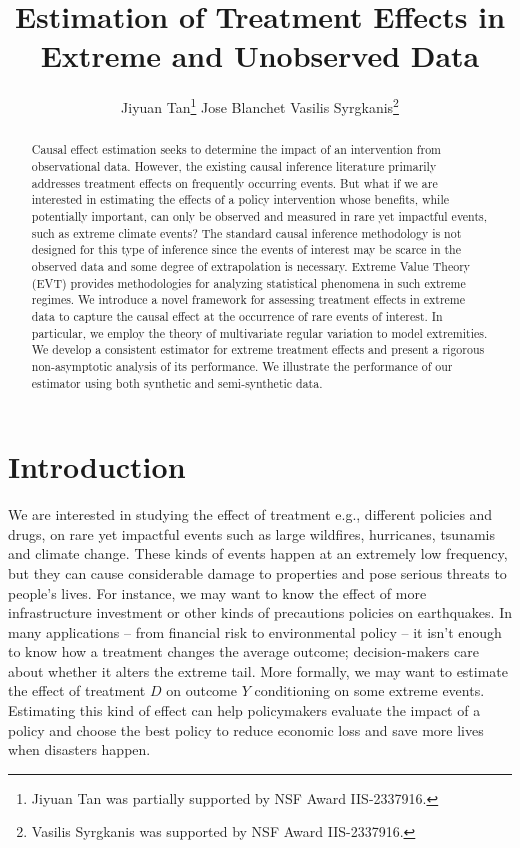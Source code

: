 \documentclass[12pt]{article}
\title{\LARGE Estimation of Treatment Effects in Extreme and Unobserved Data}
\author{Jiyuan Tan\thanks{Jiyuan Tan was partially supported by NSF Award IIS-2337916.} \quad 
  Jose Blanchet \quad 
  Vasilis Syrgkanis\thanks{Vasilis Syrgkanis was supported by NSF Award IIS-2337916.} 
  }
\date{}
\theoremstyle{plain}
\theoremstyle{definition}
\begin{document}
\maketitle

\begin{abstract}
Causal effect estimation seeks to determine the impact of an intervention from observational data. However, the existing causal inference literature primarily addresses treatment effects on frequently occurring events. But what if we are interested in estimating the effects of a policy intervention whose benefits, while potentially important, can only be observed and measured in rare yet impactful events, such as extreme climate events? The standard causal inference methodology is not designed for this type of inference since the events of interest may be scarce in the observed data and some degree of extrapolation is necessary. Extreme Value Theory (EVT) provides methodologies for analyzing statistical phenomena in such extreme regimes. We introduce a novel framework for assessing treatment effects in extreme data to capture the causal effect at the occurrence of rare events of interest. In particular, we employ the theory of multivariate regular variation to model extremities. We develop a consistent estimator for extreme treatment effects and present a rigorous non-asymptotic analysis of its performance. We illustrate the performance of our estimator using both synthetic and semi-synthetic data. 
\end{abstract}



\section{Introduction}
We are interested in studying the effect of treatment e.g., different policies and drugs, on rare yet impactful events such as large wildfires, hurricanes, tsunamis and climate change.  These kinds of events happen at an extremely low frequency, but they can cause considerable damage to properties and pose serious threats to people's lives. For instance, we may want to know the effect of more infrastructure investment or other kinds of precautions policies on earthquakes. In many applications – from financial risk to environmental policy – it isn’t enough to know how a treatment changes the average outcome; decision-makers care about whether it alters the extreme tail. More formally, we may want to estimate the effect of treatment $D$ on outcome $Y$ conditioning on some extreme events. Estimating this kind of effect can help policymakers evaluate the impact of a policy and choose the best policy to reduce economic loss and save more lives when disasters happen. 
\end{document}
